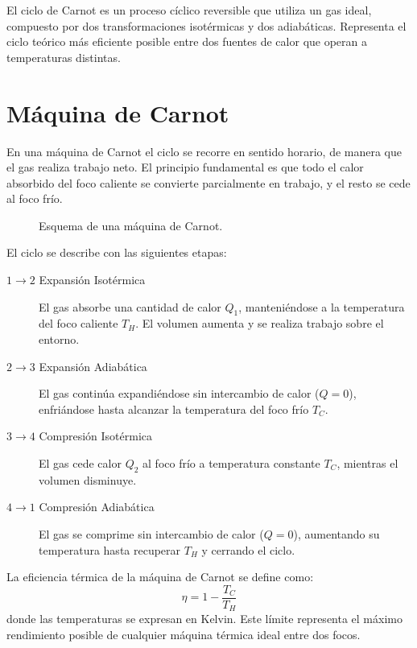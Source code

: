 
El ciclo de Carnot es un proceso cíclico reversible que utiliza un gas ideal, compuesto por dos transformaciones isotérmicas y dos adiabáticas.  
Representa el ciclo teórico más eficiente posible entre dos fuentes de calor que operan a temperaturas distintas.

\section{Máquina de Carnot}

En una máquina de Carnot el ciclo se recorre en sentido horario, de manera que el gas realiza trabajo neto.  
El principio fundamental es que todo el calor absorbido del foco caliente se convierte parcialmente en trabajo, y el resto se cede al foco frío.

\begin{figure}[h]
    \centering
    \caption{Esquema de una máquina de Carnot.}
    \label{fig:maquina-carnot}
\end{figure}

El ciclo se describe con las siguientes etapas:

\begin{description}
    \item[$1\rightarrow 2$ Expansión Isotérmica]  
    El gas absorbe una cantidad de calor $Q_1$, manteniéndose a la temperatura del foco caliente $T_H$. El volumen aumenta y se realiza trabajo sobre el entorno.

    \item[$2\rightarrow 3$ Expansión Adiabática]  
    El gas continúa expandiéndose sin intercambio de calor ($Q=0$), enfriándose hasta alcanzar la temperatura del foco frío $T_C$.

    \item[$3\rightarrow 4$ Compresión Isotérmica]  
    El gas cede calor $Q_2$ al foco frío a temperatura constante $T_C$, mientras el volumen disminuye.

    \item[$4\rightarrow 1$ Compresión Adiabática]  
    El gas se comprime sin intercambio de calor ($Q=0$), aumentando su temperatura hasta recuperar $T_H$ y cerrando el ciclo.
\end{description}

La eficiencia térmica de la máquina de Carnot se define como:
\[
\eta = 1 - \frac{T_C}{T_H}
\]
donde las temperaturas se expresan en Kelvin.  
Este límite representa el máximo rendimiento posible de cualquier máquina térmica ideal entre dos focos.

